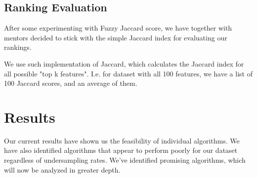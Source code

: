 \documentclass[fleqn,moreauthors,10pt]{ds_report}
\begin{document}
\subsection*{Ranking Evaluation}
After some experimenting with Fuzzy Jaccard \cite{Petkovic2021_fuji} score, we have together with mentors decided to stick with the simple Jaccard index for evaluating our rankings. 

We use such implementation of Jaccard, which calculates the Jaccard index for all possible "top k features". I.e. for dataset with all 100 features, we have a list of 100 Jaccard scores, and an average of them. 




% 




\section*{Results}

 Our current results have shown us the feasibility of individual algorithms. We have also identified algorithms that appear to perform poorly for our dataset regardless of undersampling rates. We've identified promising algorithms, which will now be analyzed in greater depth.
\end{document}
